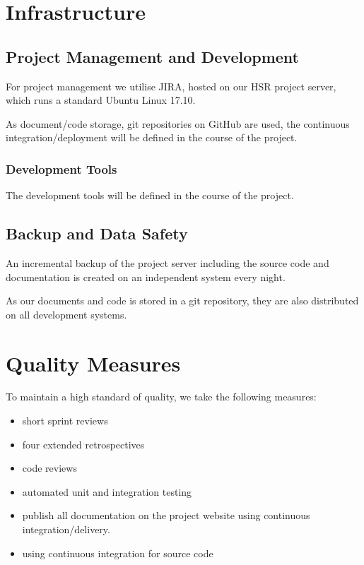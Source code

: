 \chapter{Infrastructure}
\section{Project Management and Development}
For project management we utilise JIRA\cite{atlassian-opensource}, hosted on our HSR project server, which runs a standard Ubuntu Linux 17.10.

As document/code storage, git repositories on GitHub are used, the continuous integration/deployment will be defined in the course of the project.

\subsection{Development Tools}
The development tools will be defined in the course of the project.

\section{Backup and Data Safety}
An incremental backup of the project server including the source code and documentation is created on an independent system every night.

As our documents and code is stored in a git repository, they are also distributed on all development systems.


\chapter{Quality Measures}
To maintain a high standard of quality, we take the following measures:

\begin{multicols}{2}
    \begin{itemize}
        \item short sprint reviews
        \item four extended retrospectives
        \item code reviews
        \item automated unit and integration testing
        \item publish all documentation on the project website using continuous integration/delivery.
        \item using continuous integration for source code
    \end{itemize}
\end{multicols}

